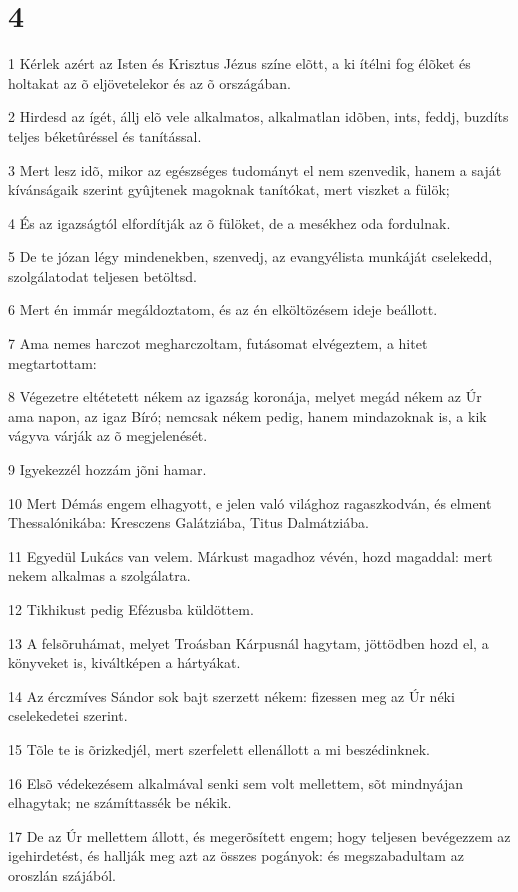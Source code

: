 \chapter{4}

\par 1 Kérlek azért az Isten és Krisztus Jézus színe elõtt, a ki ítélni fog élõket és holtakat az õ eljövetelekor és az õ országában.
\par 2 Hirdesd az ígét, állj elõ vele alkalmatos, alkalmatlan idõben, ints, feddj, buzdíts teljes béketûréssel és tanítással.
\par 3 Mert lesz idõ, mikor az egészséges tudományt el nem szenvedik, hanem a saját kívánságaik szerint gyûjtenek magoknak tanítókat, mert viszket a fülök;
\par 4 És az igazságtól elfordítják az õ fülöket, de a mesékhez oda fordulnak.
\par 5 De te józan légy mindenekben, szenvedj, az evangyélista munkáját cselekedd, szolgálatodat teljesen betöltsd.
\par 6 Mert én immár megáldoztatom, és az én elköltözésem ideje beállott.
\par 7 Ama nemes harczot megharczoltam, futásomat elvégeztem, a hitet megtartottam:
\par 8 Végezetre eltétetett nékem az igazság koronája, melyet megád nékem az Úr ama napon, az igaz Bíró; nemcsak  nékem pedig, hanem mindazoknak is, a kik vágyva várják az õ megjelenését.
\par 9 Igyekezzél hozzám jõni hamar.
\par 10 Mert Démás engem elhagyott, e jelen való világhoz ragaszkodván, és elment Thessalónikába: Kresczens Galátziába, Titus Dalmátziába.
\par 11 Egyedül Lukács van velem. Márkust magadhoz vévén, hozd magaddal: mert nekem alkalmas a szolgálatra.
\par 12 Tikhikust pedig Efézusba küldöttem.
\par 13 A felsõruhámat, melyet Troásban Kárpusnál hagytam, jöttödben hozd el, a könyveket is, kiváltképen a hártyákat.
\par 14 Az érczmíves Sándor sok bajt szerzett nékem: fizessen meg az Úr néki cselekedetei szerint.
\par 15 Tõle te is õrizkedjél, mert szerfelett ellenállott a mi beszédinknek.
\par 16 Elsõ védekezésem alkalmával senki sem volt mellettem, sõt mindnyájan elhagytak; ne számíttassék be nékik.
\par 17 De az Úr mellettem állott, és megerõsített engem; hogy teljesen bevégezzem az igehirdetést, és hallják meg azt az összes pogányok: és megszabadultam az oroszlán szájából.
